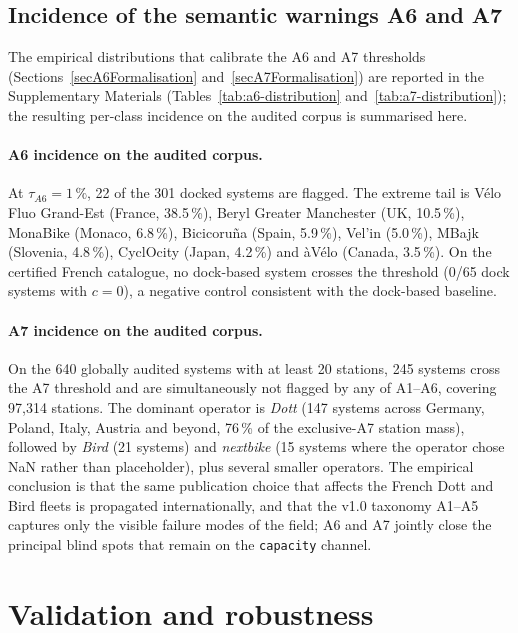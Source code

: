 \documentclass[11pt,a4paper]{article}
\begin{document}
\subsection{Incidence of the semantic warnings A6 and A7}
\label{secA6A7Incidence}
The empirical distributions that calibrate the A6 and A7 thresholds
(Sections~\ref{secA6Formalisation} and~\ref{secA7Formalisation}) are
reported in the Supplementary Materials
(Tables~\ref{tab:a6-distribution} and~\ref{tab:a7-distribution}); the
resulting per-class incidence on the audited corpus is summarised
here.

\paragraph{A6 incidence on the audited corpus.}
At $\tau_{A6} = 1\,\%$, 22 of the 301 docked systems are flagged. The
extreme tail is V\'elo Fluo Grand-Est (France, 38.5\,\%), Beryl
Greater Manchester (UK, 10.5\,\%), MonaBike (Monaco, 6.8\,\%),
Bicicoru\~na (Spain, 5.9\,\%), Vel'in (5.0\,\%), MBajk (Slovenia,
4.8\,\%), CyclOcity (Japan, 4.2\,\%) and \`aV\'elo (Canada,
3.5\,\%). On the certified French catalogue, no dock-based system
crosses the threshold (0/65 dock systems with $c = 0$), a negative
control consistent with the dock-based baseline.

\paragraph{A7 incidence on the audited corpus.}
On the 640 globally audited systems with at least 20 stations,
245 systems cross the A7 threshold and are simultaneously
not flagged by any of A1--A6, covering 97{,}314 stations.
The dominant operator is \emph{Dott} (147 systems across Germany,
Poland, Italy, Austria and beyond, 76\,\% of the exclusive-A7
station mass), followed by \emph{Bird} (21 systems) and
\emph{nextbike} (15 systems where the operator chose NaN rather
than placeholder), plus several smaller operators. The empirical conclusion is that the
same publication choice that affects the French Dott and Bird
fleets is propagated internationally, and that the v1.0 taxonomy
A1--A5 captures only the visible failure modes of the field; A6
and A7 jointly close the principal blind spots that remain on the
\texttt{capacity} channel.

\section{Validation and robustness}\label{secValidation}
\end{document}
